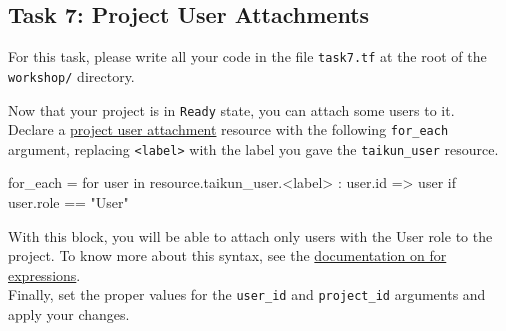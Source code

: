 \subsection{Task 7: Project User Attachments}\label{sec:task7}

\begin{note}
For this task, please write all your code in the file \texttt{task7.tf}
at the root of the \texttt{workshop/} directory.
\end{note}

Now that your project is in \texttt{Ready} state, you can attach some users to it.\\

Declare a \href{https://registry.terraform.io/providers/itera-io/taikun/latest/docs/resources/project_user_attachment}{project user attachment}
resource with the following \texttt{for\_each} argument, replacing \texttt{<label>} with the label you gave
the \texttt{taikun\_user} resource.
\begin{tf}
  for_each = {
    for user in resource.taikun_user.<label> : user.id => user
    if user.role == "User"
  }
\end{tf}
With this block, you will be able to attach only users with the User role to the project.
To know more about this syntax, see the
\href{https://www.terraform.io/docs/language/expressions/for.html}{documentation on for expressions}.\\

Finally, set the proper values for the \texttt{user\_id} and \texttt{project\_id} arguments
and apply your changes.
